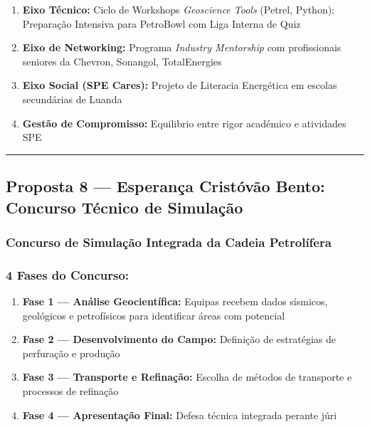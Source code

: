 \documentclass[12pt,a4paper]{article}
\begin{document}
\begin{enumerate}[itemsep=0.2cm]
    \item \textbf{Eixo Técnico:} Ciclo de Workshops \textit{Geoscience Tools} (Petrel, Python); Preparação Intensiva para PetroBowl com Liga Interna de Quiz
    
    \item \textbf{Eixo de Networking:} Programa \textit{Industry Mentorship} com profissionais seniores da Chevron, Sonangol, TotalEnergies
    
    \item \textbf{Eixo Social (SPE Cares):} Projeto de Literacia Energética em escolas secundárias de Luanda
    
    \item \textbf{Gestão de Compromisso:} Equilibrio entre rigor académico e atividades SPE
\end{enumerate}

\textcolor{spe-secondary}{\hspace{0.5cm}\rule{0.4\linewidth}{0.8pt}}

\subsection{Proposta 8 — Esperança Cristóvão Bento: Concurso Técnico de Simulação}

\subsubsection*{Concurso de Simulação Integrada da Cadeia Petrolífera}

\subsubsection*{4 Fases do Concurso:}

\begin{enumerate}[itemsep=0.15cm]
    \item \textbf{Fase 1 — Análise Geocientífica:} Equipas recebem dados sísmicos, geológicos e petrofísicos para identificar áreas com potencial
    
    \item \textbf{Fase 2 — Desenvolvimento do Campo:} Definição de estratégias de perfuração e produção
    
    \item \textbf{Fase 3 — Transporte e Refinação:} Escolha de métodos de transporte e processos de refinação
    
    \item \textbf{Fase 4 — Apresentação Final:} Defesa técnica integrada perante júri
\end{enumerate}
\end{document}
